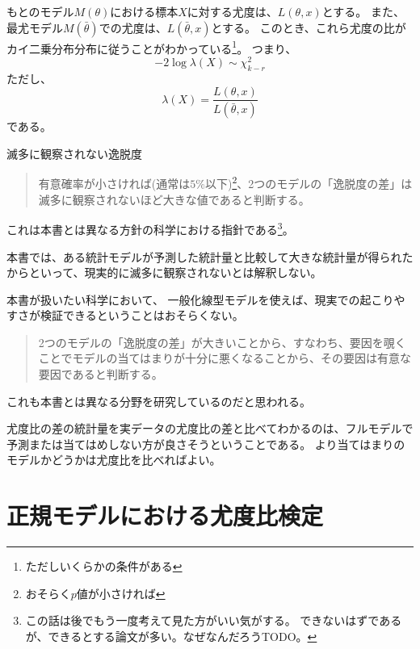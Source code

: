 もとのモデル$M(\theta)$における標本$X$に対する尤度は、$L(\theta,x)$とする。
また、最尤モデル$M(\bar{\theta})$での尤度は、$L(\bar{\theta},x)$とする。
このとき、これら尤度の比がカイ二乗分布分布に従うことがわかっている\footnote{ただしいくらかの条件がある}。
つまり、
\begin{equation*}
    -2\log\lambda(X)\sim \chi^2_{k-r}
\end{equation*}
ただし、
\begin{equation*}
    \lambda(X) = \frac{L(\theta,x)}{L(\bar{\theta},x)} 
\end{equation*}
である。

\begin{SMbox}{滅多に観察されない逸脱度}
\begin{quote}
    有意確率が小さければ(通常は$5\%$以下)\footnote{おそらく$p$値が小さければ}、2つのモデルの「逸脱度の差」は滅多に観察されないほど大きな値であると判断する。
\end{quote}
    これは本書とは異なる方針の科学における指針である\footnote{
        この話は後でもう一度考えて見た方がいい気がする。
        できないはずであるが、できるとする論文が多い。なぜなんだろうTODO。
    }。

    本書では、ある統計モデルが予測した統計量と比較して大きな統計量が得られたからといって、現実的に滅多に観察されないとは解釈しない。

    本書が扱いたい科学において、
    一般化線型モデルを使えば、現実での起こりやすさが検証できるということはおそらくない。
\begin{quote}
    2つのモデルの「逸脱度の差」が大きいことから、すなわち、要因を覗くことでモデルの当てはまりが十分に悪くなることから、その要因は有意な要因であると判断する。
\end{quote}
    これも本書とは異なる分野を研究しているのだと思われる。

    尤度比の差の統計量を実データの尤度比の差と比べてわかるのは、フルモデルで予測または当てはめしない方が良さそうということである。
    より当てはまりのモデルかどうかは尤度比を比べればよい。
\end{SMbox}

\section{正規モデルにおける尤度比検定}

